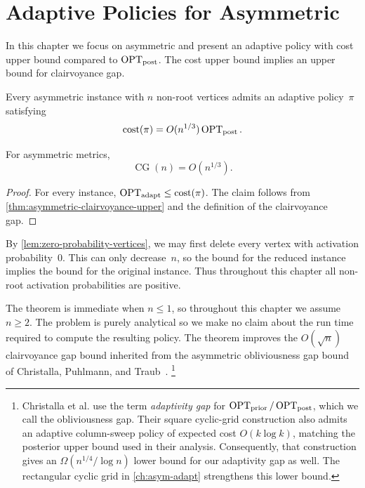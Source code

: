 \documentclass[12pt,a4paper,oneside]{report}
\begin{document}
\chapter{Adaptive Policies for Asymmetric \StochTSP{}}
\label{ch:circulation}

In this chapter we focus on asymmetric \StochTSP{} and present an adaptive policy
with cost upper bound compared to $\operatorname{OPT}_\mathrm{post}$. The cost upper bound implies an upper bound for clairvoyance gap.

\begin{theorem}
\label{thm:asymmetric-clairvoyance-upper}
Every asymmetric \StochTSP{} instance with $n$ non-root vertices admits an
adaptive policy~$\pi$ satisfying
\[
    \operatorname{cost}(\pi)=O(n^{1/3})\operatorname{OPT}_\mathrm{post}.
\]
\end{theorem}

\begin{corollary}
\label{cor:asymmetric-clairvoyance-upper}
For asymmetric metrics,
\[
    \operatorname{CG}(n)=O(n^{1/3}).
\]
\end{corollary}

\begin{proof}
For every instance, $\operatorname{OPT}_\mathrm{adapt}\le\operatorname{cost}(\pi)$.  The claim follows from
\cref{thm:asymmetric-clairvoyance-upper} and the definition of the
clairvoyance gap.
\end{proof}

By \cref{lem:zero-probability-vertices}, we may first delete every vertex with
activation probability~$0$. This can only decrease~$n$, so the bound for the
reduced instance implies the bound for the original instance. Thus throughout
this chapter all non-root activation probabilities are positive.

The theorem is immediate when $n\le1$, so throughout this chapter we assume
$n\ge2$. The problem is purely analytical so we make no claim about the run time
required to compute the resulting policy.  The theorem
improves the $O(\sqrt n)$ clairvoyance gap bound inherited from the asymmetric
obliviousness gap bound of Christalla, Puhlmann, and
Traub~\cite{Christalla2025}.%
\footnote{Christalla et al. use the term \emph{adaptivity gap} for
$\operatorname{OPT}_\mathrm{prior}/\operatorname{OPT}_\mathrm{post}$, which we call the obliviousness gap.  Their square cyclic-grid
construction also admits an adaptive column-sweep policy of expected cost
$O(k\log k)$, matching the posterior upper bound used in their analysis.
Consequently, that
construction gives an $\Omega(n^{1/4}/\log n)$ lower bound for our adaptivity
gap as well.  The rectangular cyclic grid in \cref{ch:asym-adapt} strengthens this
lower bound.}
\end{document}

